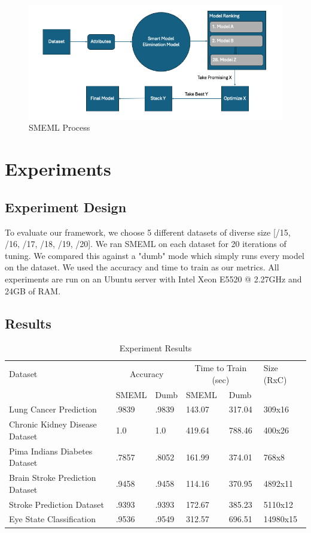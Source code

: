 \documentclass{article}
\begin{document}
\begin {figure}
\centering
\includegraphics[width=\textwidth]{smeml-flowchart.png}
\caption{SMEML Process}
\end{figure}

\section{Experiments}
\subsection{Experiment Design}
To evaluate our framework, we choose 5 different datasets of diverse size [/15, /16, /17, /18, /19, /20]. We ran SMEML on each dataset for 20 iterations of tuning. We compared this against a "dumb" mode which simply runs every model on the dataset. We used the accuracy and time to train as our metrics. All experiments are run on an Ubuntu server with Intel Xeon E5520 @ 2.27GHz and 24GB of RAM.

\subsection{Results}
\begin{table}
  \caption{Experiment Results}
  \label{model-options-table}
  \centering
  \begin{tabular}{llllll}
    \toprule
    Dataset & \multicolumn{2}{c}{Accuracy} & \multicolumn{2}{c}{Time to Train (sec)} & Size (RxC)\\
    \cmidrule(lr){2-3} \cmidrule(lr){4-5}
    & SMEML & Dumb & SMEML & Dumb \\
    \midrule
    Lung Cancer Prediction & .9839 & .9839 & 143.07 & 317.04 & 309x16\\
    Chronic Kidney Disease Dataset & 1.0 & 1.0 & 419.64 & 788.46 & 400x26\\
    Pima Indians Diabetes Dataset & .7857 & .8052 & 161.99 & 374.01 & 768x8 \\
    Brain Stroke Prediction Dataset & .9458 & .9458 & 114.16 & 370.95 & 4892x11\\
    Stroke Prediction Dataset & .9393 & .9393 & 172.67 & 385.23 & 5110x12 \\
    Eye State Classification & .9536 & .9549 & 312.57 & 696.51 & 14980x15\\ 
    \bottomrule
  \end{tabular}
\end{table}
\end{document}
